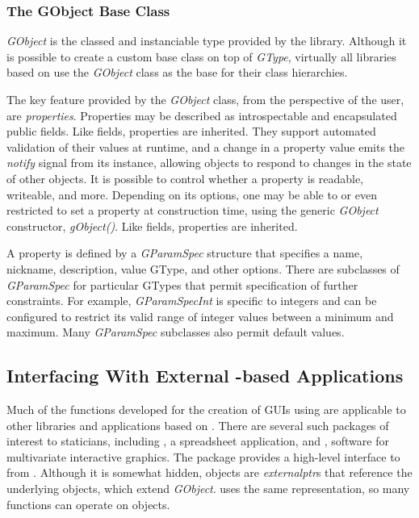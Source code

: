 \documentclass[article]{jss}
\begin{document}
\subsubsection{The GObject Base Class}

\emph{GObject} is the classed and instanciable type provided by the 
library. Although it is possible to create a custom base class on top of
\emph{GType}, virtually all libraries based on  use the 
\emph{GObject} class as the base for their class hierarchies. 

The key feature provided by the \emph{GObject} class, from the perspective of the 
 user, are \emph{properties}. Properties may be described as 
introspectable and encapsulated public fields. Like fields, properties are 
inherited. They support automated validation 
of their values at runtime, and a change in a property value emits the 
\emph{notify} signal from its instance, allowing objects to respond
to changes in the state of other objects. It is possible to control whether a 
property is readable, writeable, and more. Depending on its options,
one may be able to or even restricted to set a property at construction time, 
using the generic \emph{GObject} constructor, \emph{gObject()}. Like fields, 
properties are inherited.

A property is defined by a \emph{GParamSpec} structure that specifies a name, 
nickname, description, value GType, and other options. There are subclasses of 
\emph{GParamSpec} for particular GTypes that permit specification of further 
constraints. For example, \emph{GParamSpecInt} is specific to integers and can be
configured to restrict its valid range of integer values between a minimum and maximum.
Many \emph{GParamSpec} subclasses also permit default values.

\subsection[Interfacing With External GObject-based Applications]{Interfacing With External -based Applications}

Much of the  functions developed for the
creation of GUIs using  are applicable to other libraries
and applications based on . There are several such packages of
interest to staticians, including , a spreadsheet application, and
, software for multivariate interactive graphics. The 
package \citep{rggobi} provides a high-level interface to  from 
. Although it is somewhat hidden,  objects are 
\emph{externalptr}s that reference the underlying  objects, which
extend \emph{GObject}.  uses the same  representation, so
many  functions can operate on  objects.
\end{document}
